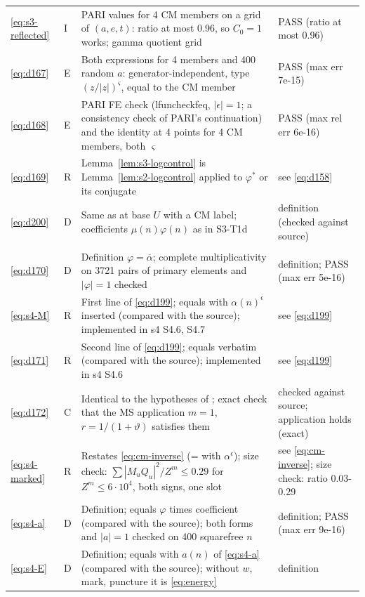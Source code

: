 \documentclass[11pt]{article}
\numberwithin{equation}{section}
\begin{document}
\begin{longtable}{@{}>{\raggedright\arraybackslash}p{1.2cm}>{\centering\arraybackslash}p{0.7cm}>{\raggedright\arraybackslash}p{9.05cm}>{\raggedright\arraybackslash}p{4.3cm}@{}}
\eqref{eq:s3-reflected} & I & PARI values for 4 CM members on a grid of $(a,e,t)$: ratio at most 0.96, so $C_0=1$ works; gamma quotient grid & PASS (ratio at most 0.96)\\
\eqref{eq:d167} & E & Both expressions for 4 members and 400 random $a$: generator-independent, type $(z/|z|)^\varsigma$, equal to the CM member & PASS (max err 7e-15)\\
\eqref{eq:d168} & E & PARI FE check (lfuncheckfeq, $|\epsilon|=1$; a consistency check of PARI's continuation) and the identity at 4 points for 4 CM members, both $\varsigma$ & PASS (max rel err 6e-16)\\
\eqref{eq:d169} & R & Lemma~\ref{lem:s3-logcontrol} is Lemma~\ref{lem:s2-logcontrol} applied to $\varphi^*$ or its conjugate & see \eqref{eq:d158}\\
\eqref{eq:d200} & D & Same as \cite[eqs.~(4.2), (4.1)]{OAI78} at base $U$ with a CM label; coefficients $\mu(n)\varphi(n)$ as in S3-T1d & definition (checked against source)\\
\multicolumn{4}{@{}l}{\emph{Appendix~E}}\\
\eqref{eq:d170} & D & Definition $\varphi=\overline\alpha$; complete multiplicativity on 3721 pairs of primary elements and $|\varphi|=1$ checked & definition; PASS (max err 5e-16)\\
\eqref{eq:s4-M} & R & First line of \eqref{eq:d199}; equals \cite{OAI78} with $\alpha(n)^\epsilon$ inserted (compared with the source); implemented in s4 S4.6, S4.7 & see \eqref{eq:d199}\\
\eqref{eq:d171} & R & Second line of \eqref{eq:d199}; equals \cite{OAI78} verbatim (compared with the source); implemented in s4 S4.6 & see \eqref{eq:d199}\\
\eqref{eq:d172} & C & Identical to the hypotheses of \cite[Lemma~17.1]{OAI78}; exact check that the MS application $m=1$, $r=1/(1+\vartheta)$ satisfies them & checked against source; application holds (exact)\\
\eqref{eq:s4-marked} & R & Restates \eqref{eq:cm-inverse} (= \cite[eq.~(17.1)]{OAI78} with $\alpha^\epsilon$); size check: $\sum|M_uQ_u|^2/Z^m\le0.29$ for $Z^m\le6\cdot10^4$, both signs, one slot & see \eqref{eq:cm-inverse}; size check: ratio 0.03-0.29\\
\eqref{eq:s4-a} & D & Definition; equals $\varphi$ times \cite{OAI78} coefficient (compared with the source); both forms and $|a|=1$ checked on 400 squarefree $n$ & definition; PASS (max err 9e-16)\\
\eqref{eq:s4-E} & D & Definition; equals \cite[eq.~(17.3)]{OAI78} with $a(n)$ of \eqref{eq:s4-a} (compared with the source); without $w$, mark, puncture it is \eqref{eq:energy} & definition\\

\end{longtable}
\end{document}
